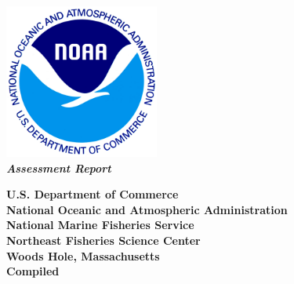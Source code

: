 \begin{titlingpage}
\begin{center}
\includegraphics[height=2in,keepaspectratio=true]{./NOAA_Transparent_Logo.png}
\vfill
\huge{\textbf{\SPPnameT{}}} \\
\vfill
\huge{\textit{\textbf{ \RptYr{} Assessment \ReportType{} Report}}}
\vspace*{\fill}

\large{\textbf{U.S. Department of Commerce\\
National Oceanic and Atmospheric Administration\\
National Marine Fisheries Service\\
Northeast Fisheries Science Center\\
Woods Hole, Massachusetts\\}
\vspace*{\fill}
\textbf{Compiled \monthname{}  \the\year{}}}
\end{center}
\end{titlingpage}
